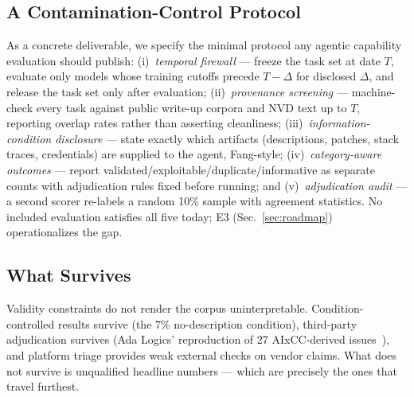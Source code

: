 \subsection{A Contamination-Control Protocol}
As a concrete deliverable, we specify the minimal protocol any agentic capability evaluation
should publish: (i)~\emph{temporal firewall} --- freeze the task set at date $T$, evaluate only
models whose training cutoffs precede $T-\Delta$ for disclosed $\Delta$, and release the task
set only after evaluation; (ii)~\emph{provenance screening} --- machine-check every task against
public write-up corpora and NVD text up to $T$, reporting overlap rates rather than asserting
cleanliness; (iii)~\emph{information-condition disclosure} --- state exactly which artifacts
(descriptions, patches, stack traces, credentials) are supplied to the agent, Fang-style;
(iv)~\emph{category-aware outcomes} --- report validated/exploitable/duplicate/informative as
separate counts with adjudication rules fixed before running; and (v)~\emph{adjudication
audit} --- a second scorer re-labels a random 10\% sample with agreement statistics. No
included evaluation satisfies all five today; E3 (Sec.~\ref{sec:roadmap}) operationalizes the
gap.

\subsection{What Survives}
Validity constraints do not render the corpus uninterpretable. Condition-controlled results
survive (the 7\% no-description condition), third-party adjudication survives (Ada Logics'
reproduction of 27 AIxCC-derived issues~\cite{openssfaixcc2026}), and platform triage provides
weak external checks on vendor claims. What does not survive is unqualified headline numbers ---
which are precisely the ones that travel furthest.
